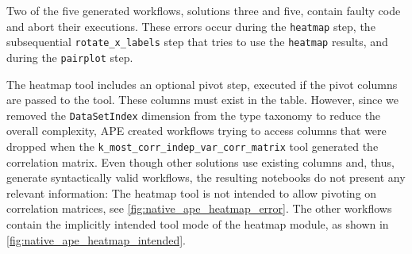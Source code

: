Two of the five generated workflows, solutions three and five, contain faulty code and abort their executions. These errors occur during the \verb|heatmap| step, the subsequential \verb|rotate_x_labels| step that tries to use the \verb|heatmap| results, and during the \verb|pairplot| step.

The heatmap tool includes an optional pivot step, executed if the pivot columns are passed to the tool. These columns must exist in the table. However, since we removed the \verb|DataSetIndex| dimension from the type taxonomy to reduce the overall complexity, APE created workflows trying to access columns that were dropped when the \verb|k_most_corr_indep_var_corr_matrix| tool generated the correlation matrix. Even though other solutions use existing columns and, thus, generate syntactically valid workflows, the resulting notebooks do not present any relevant information: The heatmap tool is not intended to allow pivoting on correlation matrices, see \autoref{fig:native_ape_heatmap_error}. The other workflows contain the implicitly intended tool mode of the heatmap module, as shown in \autoref{fig:native_ape_heatmap_intended}.


